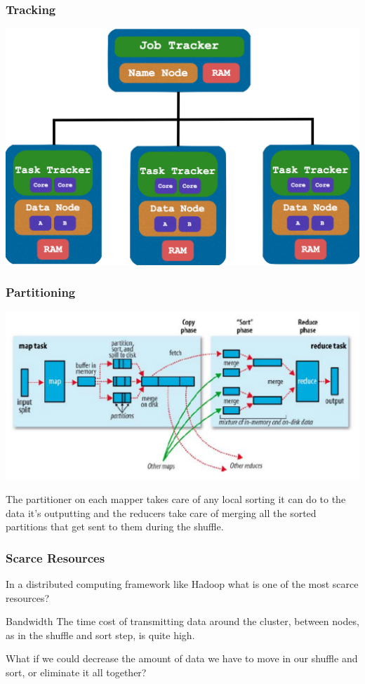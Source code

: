 \documentclass{beamer}
\begin{document}
\begin{frame}
  \frametitle{Tracking}
  \begin{center}
    \includegraphics[width=\textwidth]{../images/tracking.png}
  \end{center}
\end{frame}

\begin{frame}
  \frametitle{Partitioning}
  \begin{center}
    \includegraphics[width=\textwidth]{../images/partitioning.png}
  \end{center}

    \parbox{\linewidth}{\small The partitioner on each mapper takes care of any local sorting it can do to the data it's outputting and the reducers take care of merging all the sorted partitions that get sent to them during the shuffle.}
\end{frame}

\begin{frame}
  \frametitle{Scarce Resources}
    In a distributed computing framework like Hadoop what is one of the most scarce resources? \pause
  \vspace{2mm}
  \begin{alertblock}{Bandwidth}
    The time cost of transmitting data around the cluster, between nodes, as in the shuffle and sort step, is quite high.
  \end{alertblock} \pause
  \vspace{4mm}
  \parbox{\linewidth}{What if we could decrease the amount of data we have to move in our shuffle and sort, or eliminate it all together?}
\end{frame}
\end{document}
